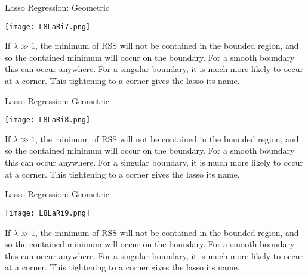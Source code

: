\documentclass[10pt, table, dvipsnames,xcdraw,handout]{beamer}
\begin{document}
\begin{frame}[fragile]{Lasso Regression: Geometric} 
  \begin{minipage}[t][0.5\textheight][t]{\textwidth}
	\centering \texttt{[image: L8LaRi7.png]} 
  \end{minipage}
  \vfill
\begin{minipage}[t][0.5\textheight][t]{\textwidth}
If $\lambda\gg 1$, the minimum of RSS will not be contained in the bounded region, and so the contained minimum will occur on the boundary. For a smooth boundary this can occur anywhere. For a singular boundary, it is much more likely to occur at a corner. This tightening to a corner gives the lasso its name.  
\end{minipage}
\end{frame}



\begin{frame}[fragile]{Lasso Regression: Geometric} 
  \begin{minipage}[t][0.5\textheight][t]{\textwidth}
	\centering \texttt{[image: L8LaRi8.png]} 
  \end{minipage}
  \vfill
\begin{minipage}[t][0.5\textheight][t]{\textwidth}
If $\lambda\gg 1$, the minimum of RSS will not be contained in the bounded region, and so the contained minimum will occur on the boundary. For a smooth boundary this can occur anywhere. For a singular boundary, it is much more likely to occur at a corner. This tightening to a corner gives the lasso its name.  
\end{minipage}
\end{frame}



\begin{frame}[fragile]{Lasso Regression: Geometric} 
  \begin{minipage}[t][0.5\textheight][t]{\textwidth}
	\centering \texttt{[image: L8LaRi9.png]} 
  \end{minipage}
  \vfill
\begin{minipage}[t][0.5\textheight][t]{\textwidth}
If $\lambda\gg 1$, the minimum of RSS will not be contained in the bounded region, and so the contained minimum will occur on the boundary. For a smooth boundary this can occur anywhere. For a singular boundary, it is much more likely to occur at a corner. This tightening to a corner gives the lasso its name.  
\end{minipage}
\end{frame}
\end{document}
